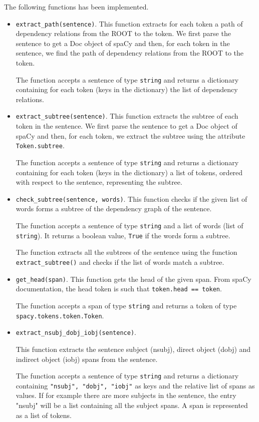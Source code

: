 \documentclass{article}
\begin{document}
The following functions has been implemented.
\begin{itemize}
    \item \texttt{extract\_path(sentence)}. This function extracts for each token a path of dependency relations from the 
    ROOT to the token. We first parse the sentence to get a Doc object of spaCy and then, for each token in the sentence,
    we find the path of dependency relations from the ROOT to the token.

    The function accepts a sentence of type \texttt{string} and returns a dictionary containing for each token (keys in the dictionary)
    the list of dependency relations.

    \item \texttt{extract\_subtree(sentence)}. This function extracts the subtree of each token in the sentence. We first parse 
    the sentence to get a Doc object of spaCy and then, for each token, we extract the subtree using the attribute \texttt{Token.subtree}.

    The function accepts a sentence of type \texttt{string} and returns a dictionary containing for each token (keys in the dictionary)
    a list of tokens, ordered with respect to the sentence, representing the subtree.

    \item \texttt{check\_subtree(sentence, words)}. This function checks if the given list of words forms a subtree of the 
    dependency graph of the sentence.

    The function accepts a sentence of type \texttt{string} and a list of words (list of \texttt{string}). It returns a boolean value, 
    \texttt{True} if the words form a subtree.

    The function extracts all the subtrees of the sentence using the function \texttt{extract\_subtree()} and checks if the list of words
    match a subtree.

    \item \texttt{get\_head(span)}. This function gets the head of the given span. From spaCy documentation, the head token is such that
    \texttt{token.head == token}.

    The function accepts a span of type \texttt{string} and returns a token of type \texttt{spacy.tokens.token.Token}.

    \item \texttt{extract\_nsubj\_dobj\_iobj(sentence)}. 
    
    This function extracts the sentence subject (nsubj), direct object (dobj) and 
    indirect object (iobj) spans from the sentence.

    The function accepts a sentence of type \texttt{string} and returns a dictionary containing \texttt{"nsubj", "dobj", "iobj"} as keys 
    and the relative list of spans as values. If for example there are more subjects in the sentence, the entry "nsubj" will be a list 
    containing all the subject spans. A span is represented as a list of tokens.

    
\end{itemize}

\end{document}
